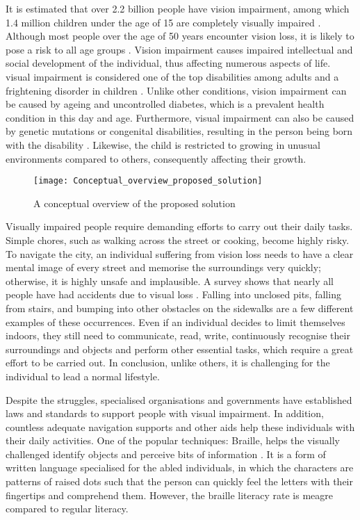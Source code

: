 \documentclass[journal,12pt,onecolumn,letterpaper]{IEEEtran}
\begin{document}
It is estimated that over 2.2 billion people have vision impairment, among which 1.4 million children under the age of 15 are completely visually impaired \cite{pascolini_global_2012}. Although most people over the age of 50 years encounter vision loss, it is likely to pose a risk to all age groups \cite{ulldemolins_social_2012}. Vision impairment causes impaired intellectual and social development of the individual, thus affecting numerous aspects of life.  visual impairment is considered one of the top disabilities among adults and a frightening disorder in children \cite{rahi_severe_2003}. Unlike other conditions, vision impairment can be caused by ageing and uncontrolled diabetes, which is a prevalent health condition in this day and age. Furthermore,  visual impairment can also be caused by genetic mutations or congenital disabilities, resulting in the person being born with the disability \cite{dineen_causes_2007}. Likewise, the child is restricted to growing in unusual environments compared to others, consequently affecting their growth.

\begin{figure*}[htbp]
\centering
\texttt{[image: Conceptual\_overview\_proposed\_solution]}
\caption{A conceptual overview of the proposed solution}
\label{FIG:Conceptual_overview_proposed_solution}
\end{figure*}

Visually impaired people require demanding efforts to carry out their daily tasks. Simple chores, such as walking across the street or cooking, become highly risky. To navigate the city, an individual suffering from vision loss needs to have a clear mental image of every street and memorise the surroundings very quickly; otherwise, it is highly unsafe and implausible. A survey shows that nearly all people have had accidents due to visual loss \cite{frick_economic_2007}. Falling into unclosed pits, falling from stairs, and bumping into other obstacles on the sidewalks are a few different examples of these occurrences. Even if an individual decides to limit themselves indoors, they still need to communicate, read, write, continuously recognise their surroundings and objects and perform other essential tasks, which require a great effort to be carried out. In conclusion, unlike others, it is challenging for the individual to lead a normal lifestyle. 

Despite the struggles, specialised organisations and governments have established laws and standards to support people with visual impairment. In addition, countless adequate navigation supports and other aids help these individuals with their daily activities. One of the popular techniques: Braille, helps the visually challenged identify objects and perceive bits of information \cite{jimenez_biography_2009}. It is a form of written language specialised for the abled individuals, in which the characters are patterns of raised dots such that the person can quickly feel the letters with their fingertips and comprehend them. However, the braille literacy rate is meagre compared to regular literacy.
\end{document}
